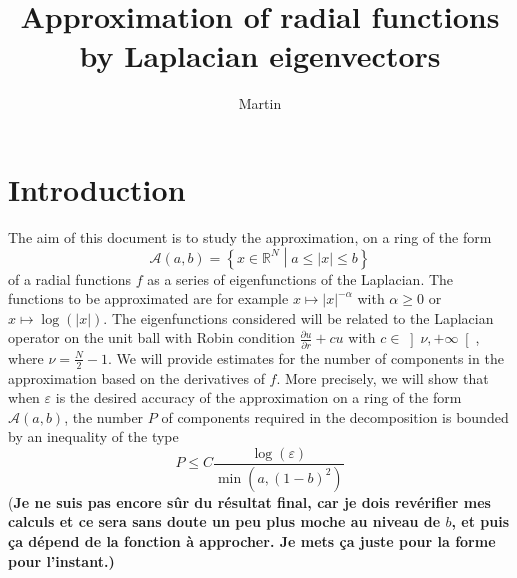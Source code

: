 \documentclass[11pt,a4paper]{article}
\author{Martin}
\title{Approximation of radial functions by Laplacian eigenvectors}
\begin{document}
\maketitle
\theoremstyle{plain}
\newtheorem{The}{Theorem}[section]
\newtheorem{Prop}{Proposition}[section]
\newtheorem{Cor}{Corollary}[section]
\newtheorem{Lem}{Lemma}[section]

\theoremstyle{definition}
\newtheorem{Rem}{Remark}[section]
\newtheorem{Def}{Definition}[section]
\newcommand{\enstq}[2]{\left\{#1\mathrel{}\middle|\mathrel{}#2\right\}}
\newcommand{\Lp}[2]{L^#1(#2)}
\newcommand{\Sob}[3]{W^{#1,#2}(#3)}
\newcommand{\RN}[0]{\mathbb{R}^N}
\newcommand{\R}[0]{\mathbb{R}}
\newcommand{\norm}[1]{\left\|#1\right\|}
\newcommand{\sinc}[0]{\textup{sinc}}
\newcommand{\functionDef}[5]{\begin{array}{lllll}
#1 & : & #2 & \longrightarrow & #3 \\
 & & #4 & \longmapsto &\displaystyle #5 \\
\end{array}}
\newcommand{\N}{\mathbb{N}}
\newcommand{\D}{\mathbb{D}}
\newcommand{\A}{\mathcal{A}_{a,b}}
\newcommand{\Crad}{C^\infty_{c,rad}(B)}
\newcommand{\Lrad}{L^2_{rad}(B)}
\newcommand{\Lradab}{L^2_{rad}(\mathcal{A}_{a,b})}
\newcommand{\duality}[2]{\left\langle #1,#2\right\rangle}
\newcommand{\Hrad}{H^1_{rad}(B)}
\newcommand{\Hzrad}{H^1_{0,rad}(B)}

\section{Introduction}
The aim of this document is to study the approximation, on a ring of the form \[\mathcal{A}(a,b) = \enstq{x \in \RN}{a\leq |x| \leq b}\] of a radial functions $f$ as a series of eigenfunctions of the Laplacian. The functions to be approximated are for example $x \mapsto |x|^{-\alpha}$ with $\alpha \geq 0$ or $x \mapsto \log(|x|)$. The eigenfunctions considered will be related to the Laplacian operator on the unit ball with Robin condition $\frac{\partial u}{\partial r} + cu$ with $c\in \left] \nu, +\infty\right[$, where $\nu = \frac{N}{2}-1$. We will provide estimates for the number of components in the approximation based on the derivatives of $f$. More precisely, we will show that when $\varepsilon$ is the desired accuracy of the approximation on a ring of the form $\mathcal{A}(a,b)$, the number $P$ of components required in the decomposition is bounded by an inequality of the type
\[ P \leq C\frac{\log(\varepsilon)}{\min(a,(1-b)^2)}\]  
(\textbf{Je ne suis pas encore sûr du résultat final, car je dois revérifier mes calculs et ce sera sans doute un peu plus moche au niveau de $b$, et puis ça dépend de la fonction à approcher. Je mets ça juste pour la forme pour l'instant.) }
\end{document}
